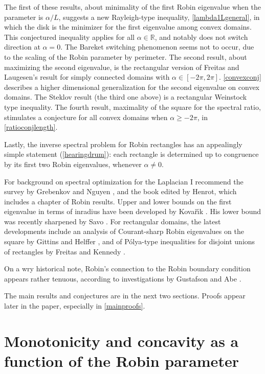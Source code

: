\documentclass[12pt,reqno]{amsart}
\theoremstyle{definition}
\newcommand{\R}{{\mathbb R}}
\begin{document}
%
The first of these results, about minimality of the first Robin eigenvalue when the parameter is $\alpha/L$, suggests a new Rayleigh-type inequality, \autoref{lambda1Lgeneral}, in which the disk is the minimizer for the first eigenvalue among convex domains. This conjectured inequality applies for all $\alpha \in \R$, and notably does not switch direction at $\alpha=0$. The Bareket switching phenomenon seems not to occur, due to the scaling of the Robin parameter by perimeter. The second result, about maximizing the second eigenvalue, is the rectangular version of Freitas and Laugesen's \cite{FL18b} result for simply connected domains with $\alpha \in [-2\pi,2\pi]$. \autoref{convexconj} describes a higher dimensional generalization for the second eigenvalue on convex domains. The Steklov result (the third one above) is a rectangular Weinstock type inequality. The fourth result, maximality of the square for the spectral ratio, stimulates a conjecture for all convex domains when $\alpha \geq -2\pi$, in \autoref{ratioconjlength}. 

Lastly, the inverse spectral problem for Robin rectangles has an appealingly simple statement (\autoref{hearingdrum}): each rectangle is determined up to congruence by its first two Robin eigenvalues, whenever $\alpha \neq 0$. 

For background on spectral optimization for the Laplacian I recommend the survey by Grebenkov and Nguyen \cite{GN13}, and the book \cite{H17} edited by Henrot, which includes a chapter of Robin results. Upper and lower bounds on the first eigenvalue in terms of inradius have been developed by Kova\v{r}\'{\i}k \cite[Theorem 4.5]{Ko14}. His lower bound was recently sharpened by Savo \cite[Corollary 3]{S19}. For rectangular domains, the latest developments include an analysis of Courant-sharp Robin eigenvalues on the square by Gittins and Helffer \cite{GH19}, and of P\'{o}lya-type inequalities for disjoint unions of rectangles by Freitas and Kennedy \cite{FK18}. 

On a wry historical note, Robin's connection to the Robin boundary condition appears rather tenuous, according to investigations by Gustafson and Abe \cite{GA98}. 

\smallskip
The main results and conjectures are in the next two sections. Proofs appear later in the paper, especially in \autoref{mainproofs}. 

\section{\bf Monotonicity and concavity as a function of the Robin parameter}
\label{results}
\end{document}
